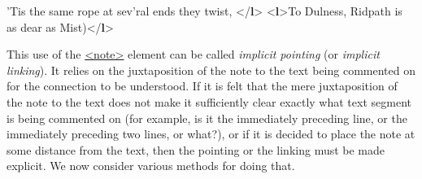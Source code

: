 \begin{shaded}
\hspace*{1em}\mbox{}\newline 
{}'Tis the same rope at sev'ral ends they twist,\mbox{}\newline 
{</\textbf{l}>}\mbox{}\newline 
{<\textbf{l}>}To Dulness, Ridpath is as dear as Mist){</\textbf{l}>}\end{shaded}\egroup\par \noindent  \par
This use of the \hyperref[TEI.note]{<note>} element can be called \textit{implicit pointing} (or \textit{implicit linking}). It relies on the juxtaposition of the note to the text being commented on for the connection to be understood. If it is felt that the mere juxtaposition of the note to the text does not make it sufficiently clear exactly what text segment is being commented on (for example, is it the immediately preceding line, or the immediately preceding two lines, or what?), or if it is decided to place the note at some distance from the text, then the pointing or the linking must be made explicit. We now consider various methods for doing that.\par
